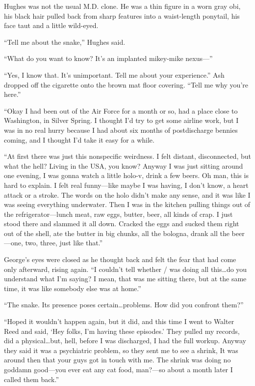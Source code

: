 Hughes was not the usual M.D. clone. He was a thin figure in a worn gray obi, his black hair pulled back from sharp features into a waist-length ponytail, his face taut and a little wild-eyed.

``Tell me about the snake,'' Hughes said.

``What do you want to know? It's an implanted mikey-mike nexus---''

``Yes, I know that. It's unimportant. Tell me about your experience.'' Ash dropped off the cigarette onto the brown mat floor covering. ``Tell me why you're here.''

``Okay I had been out of the Air Force for a month or so, had a place close to Washington, in Silver Spring. I thought I'd try to get some airline work, but I was in no real hurry because I had about six months of postdischarge bennies coming, and I thought I'd take it easy for a while.

``At first there was just this nonspecific weirdness. I felt distant, disconnected, but what the hell? Living in the USA, you know? Anyway I was just sitting around one evening, I was gonna watch a little holo-v, drink a few beers. Oh man, this is hard to explain. I felt real funny—like maybe I was having, I don't know, a heart attack or a stroke. The words on the holo didn't make any sense, and it was like I was seeing everything underwater. Then I was in the kitchen pulling things out of the refrigerator—lunch meat, raw eggs, butter, beer, all kinds of crap. I just stood there and slammed it all down. Cracked the eggs and sucked them right out of the shell, ate the butter in big chunks, all the bologna, drank all the beer—one, two, three, just like that.''

George's eyes were closed as he thought back and felt the fear that had come only afterward, rising again. ``I couldn't tell whether / was doing all this\ldots do you understand what I'm saying? I mean, that was me sitting there, but at the same time, it was like somebody else was at home.''

``The snake. Its presence poses certain\ldots problems. How did you confront them?''

``Hoped it wouldn't happen again, but it did, and this time I went to Walter Reed and said, ‘Hey folks, I'm having these episodes.' They pulled my records, did a physical\ldots but, hell, before I was discharged, I had the full workup. Anyway they said it was a psychiatric problem, so they sent me to see a shrink, It was around then that your guys got in touch with me. The shrink was doing no goddamn good—you ever eat any cat food, man?—so about a month later I called them back.''

